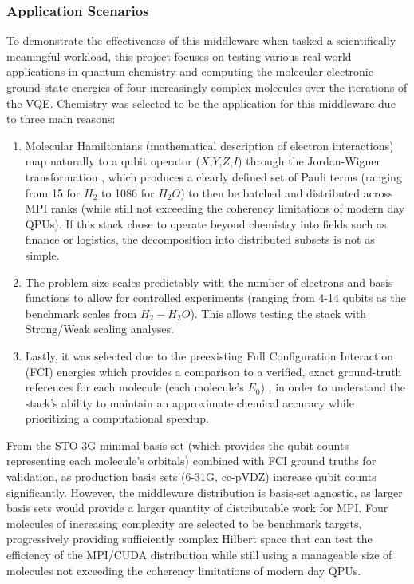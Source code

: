 \subsubsection{Application Scenarios}
To demonstrate the effectiveness of this middleware when tasked a scientifically meaningful workload, this project focuses on testing various real-world applications in
quantum chemistry and computing the molecular electronic ground-state energies of four increasingly complex molecules over the iterations of the VQE. Chemistry was selected to be the  
application for this middleware due to three main reasons: 
    \begin{enumerate}
        \item Molecular Hamiltonians (mathematical description of electron interactions) map naturally to a qubit operator ($X$,$Y$,$Z$,$I$) through the Jordan-Wigner transformation \parencite{peruzzo2014variational}, which produces a clearly defined set of Pauli terms (ranging from 15 for $H_2$ to 1086 for $H_{2}O$) to then be batched and distributed across MPI ranks (while still not exceeding the coherency limitations of modern day QPUs). If this stack chose to operate beyond chemistry into fields such as finance or logistics, the decomposition into distributed subsets is not as simple. 
        \item The problem size scales predictably with the number of electrons and basis functions to allow for controlled experiments (ranging from 4-14 qubits as the benchmark scales from $H_2 - H_{2}O$). This allows testing the stack with Strong/Weak scaling analyses.  
        \item Lastly, it was selected due to the preexisting Full Configuration Interaction (FCI) energies which provides a comparison to a verified, exact ground-truth references for each molecule (each molecule's $E_0$) \parencite{szabo1996modernquantumchemistry}, in order to understand the stack's ability to maintain an approximate chemical accuracy while prioritizing a computational speedup. 
    \end{enumerate}

From the STO-3G minimal basis set (which provides the qubit counts representing each molecule's orbitals) \parencite{szabo1996modernquantumchemistry} 
combined with FCI ground truths for validation, as production basis sets (6-31G, cc-pVDZ) increase qubit counts significantly. However, the 
middleware distribution is basis-set agnostic, as larger basis sets would provide a larger quantity of distributable work for MPI. 
Four molecules of increasing complexity are selected to be benchmark targets, progressively providing sufficiently complex Hilbert space that can test the 
efficiency of the MPI/CUDA distribution while still using a manageable size of molecules not exceeding the coherency limitations of modern day QPUs. 

